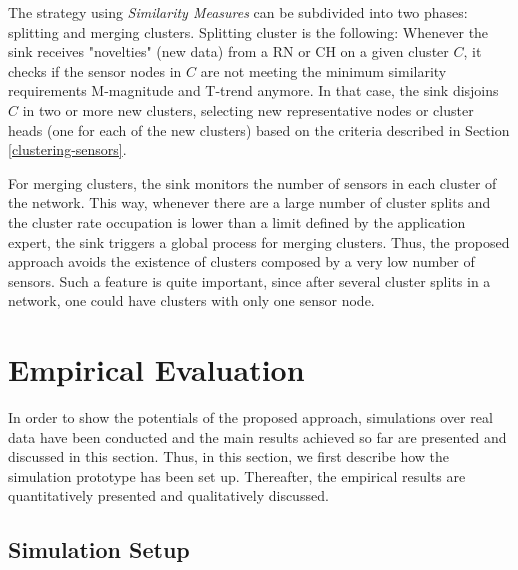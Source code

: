 \documentclass[conference]{IEEEtran}
\begin{document}

The strategy using \textit{Similarity Measures} can be subdivided into two
phases: splitting and merging clusters. Splitting cluster is the following:
Whenever the sink receives "novelties" (new data) from a RN or CH on a given
cluster $C$, it checks if the sensor nodes in $C$ are not meeting the minimum
similarity requirements M-magnitude and T-trend anymore. In that case, the sink
disjoins $C$ in two or more new clusters, selecting new representative nodes or
cluster heads (one for each of the new clusters) based on the criteria described
in Section \ref{clustering-sensors}.

For merging clusters, the sink monitors the number of sensors in each cluster of
the network. This way, whenever there are a large number of cluster splits and
the cluster rate occupation is lower than a limit defined by the application
expert, the sink triggers a global process for merging clusters. Thus, the
proposed approach avoids the existence of clusters composed by a very low number
of sensors. Such a feature is quite important, since after several cluster
splits in a network, one could have clusters with only one sensor node.

\section{Empirical Evaluation}
\label{eval}

In order to show the potentials of the proposed approach, simulations over real
data have been conducted and the main results achieved so far are presented and
discussed in this section. Thus, in this section, we first describe how the
simulation prototype has been set up. Thereafter, the empirical results are
quantitatively presented and qualitatively discussed.

\subsection{Simulation Setup}
\label{data-and-experiments}
\end{document}
